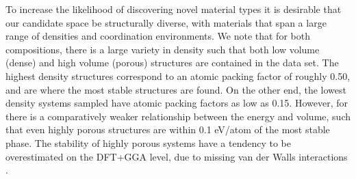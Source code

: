 To increase the likelihood of discovering novel material types it is desirable that our candidate space be structurally diverse, with materials that span a large range of densities and coordination environments.
%
We note that for both compositions, there is a large variety in density such that both low volume (dense) and high volume (porous) structures are contained in the data set.
%
The highest density structures correspond to an atomic packing factor of roughly 0.50, and are where the most stable structures are found.
%
On the other end, the lowest density systems sampled have atomic packing factors as low as 0.15.
%
However, for \IrOthree there is a comparatively weaker relationship between the energy and volume,
such that even highly porous structures are within 0.1 eV/atom of the most stable phase.
%
The stability of highly porous systems have a tendency to be overestimated on the DFT+GGA level, due to missing van der Walls interactions \cite{}.
%
%
%
%


